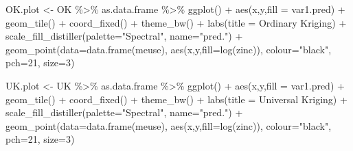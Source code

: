 \documentclass[
]{book}
\newenvironment{Shaded}{\begin{snugshade}}{\end{snugshade}}
\newcommand{\AttributeTok}[1]{\textcolor[rgb]{0.77,0.63,0.00}{#1}}
\newcommand{\DecValTok}[1]{\textcolor[rgb]{0.00,0.00,0.81}{#1}}
\newcommand{\FunctionTok}[1]{\textcolor[rgb]{0.00,0.00,0.00}{#1}}
\newcommand{\NormalTok}[1]{#1}
\newcommand{\OtherTok}[1]{\textcolor[rgb]{0.56,0.35,0.01}{#1}}
\newcommand{\SpecialCharTok}[1]{\textcolor[rgb]{0.00,0.00,0.00}{#1}}
\newcommand{\StringTok}[1]{\textcolor[rgb]{0.31,0.60,0.02}{#1}}
\begin{document}
\begin{Shaded}
\begin{Highlighting}[]
\NormalTok{OK.plot }\OtherTok{\textless{}{-}}\NormalTok{ OK }\SpecialCharTok{\%\textgreater{}\%}\NormalTok{ as.data.frame }\SpecialCharTok{\%\textgreater{}\%}
  \FunctionTok{ggplot}\NormalTok{() }\SpecialCharTok{+} \FunctionTok{aes}\NormalTok{(x,y,}\AttributeTok{fill =}\NormalTok{ var1.pred) }\SpecialCharTok{+} 
  \FunctionTok{geom\_tile}\NormalTok{() }\SpecialCharTok{+} \FunctionTok{coord\_fixed}\NormalTok{() }\SpecialCharTok{+} \FunctionTok{theme\_bw}\NormalTok{() }\SpecialCharTok{+} \FunctionTok{labs}\NormalTok{(}\AttributeTok{title =} \StringTok{\textquotesingle{}Ordinary Kriging\textquotesingle{}}\NormalTok{) }\SpecialCharTok{+} 
  \FunctionTok{scale\_fill\_distiller}\NormalTok{(}\AttributeTok{palette=}\StringTok{"Spectral"}\NormalTok{, }\AttributeTok{name=}\StringTok{"pred."}\NormalTok{)  }\SpecialCharTok{+} 
  \FunctionTok{geom\_point}\NormalTok{(}\AttributeTok{data=}\FunctionTok{data.frame}\NormalTok{(meuse), }\FunctionTok{aes}\NormalTok{(x,y,}\AttributeTok{fill=}\FunctionTok{log}\NormalTok{(zinc)), }\AttributeTok{colour=}\StringTok{"black"}\NormalTok{,}
             \AttributeTok{pch=}\DecValTok{21}\NormalTok{, }\AttributeTok{size=}\DecValTok{3}\NormalTok{) }

\NormalTok{UK.plot }\OtherTok{\textless{}{-}}\NormalTok{ UK }\SpecialCharTok{\%\textgreater{}\%}\NormalTok{ as.data.frame }\SpecialCharTok{\%\textgreater{}\%}
  \FunctionTok{ggplot}\NormalTok{() }\SpecialCharTok{+} \FunctionTok{aes}\NormalTok{(x,y,}\AttributeTok{fill =}\NormalTok{ var1.pred) }\SpecialCharTok{+} 
  \FunctionTok{geom\_tile}\NormalTok{() }\SpecialCharTok{+} \FunctionTok{coord\_fixed}\NormalTok{() }\SpecialCharTok{+} \FunctionTok{theme\_bw}\NormalTok{() }\SpecialCharTok{+} \FunctionTok{labs}\NormalTok{(}\AttributeTok{title =} \StringTok{\textquotesingle{}Universal Kriging\textquotesingle{}}\NormalTok{) }\SpecialCharTok{+} 
  \FunctionTok{scale\_fill\_distiller}\NormalTok{(}\AttributeTok{palette=}\StringTok{"Spectral"}\NormalTok{, }\AttributeTok{name=}\StringTok{"pred."}\NormalTok{)  }\SpecialCharTok{+} 
  \FunctionTok{geom\_point}\NormalTok{(}\AttributeTok{data=}\FunctionTok{data.frame}\NormalTok{(meuse), }\FunctionTok{aes}\NormalTok{(x,y,}\AttributeTok{fill=}\FunctionTok{log}\NormalTok{(zinc)), }\AttributeTok{colour=}\StringTok{"black"}\NormalTok{,}
             \AttributeTok{pch=}\DecValTok{21}\NormalTok{, }\AttributeTok{size=}\DecValTok{3}\NormalTok{) }
 

\end{Highlighting}
\end{Shaded}
\end{document}
